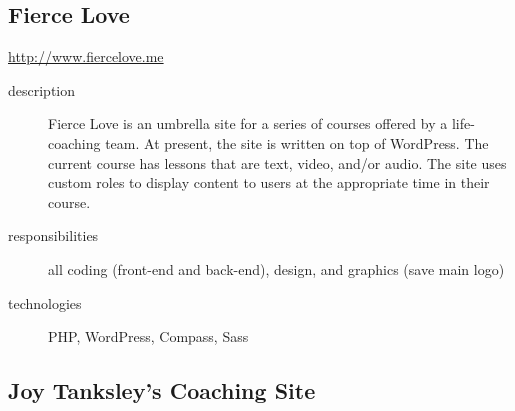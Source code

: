 \documentclass{article}
\begin{document}
\subsection{Fierce Love} %
\label{sub:Fierce Love}

\begin{multicols}{2}
\href{http://www.fiercelove.me}{http://www.fiercelove.me}

\begin{description}
  \item[description] Fierce Love is an umbrella site for a series of courses offered by a life-coaching team.  At present, the site is written on top of WordPress.  The current course has lessons that are text, video, and/or audio.  The site uses custom roles to display content to users at the appropriate time in their course.
  \item[responsibilities] all coding (front-end and back-end), design, and graphics (save main logo)
  \item[technologies] PHP, WordPress, Compass, Sass
\end{description}

\vfill
\columnbreak
{}
\end{multicols}

\subsection{Joy Tanksley's Coaching Site} %
\label{sub:Joy Tanksley's Coaching Site}
\end{document}
